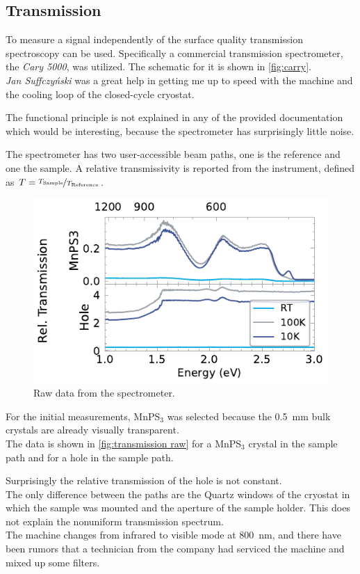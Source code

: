 \documentclass[
	oneside,
	parskip=half,
	a4paper,
]{scrbook}
\begin{document}
\subsection{Transmission}
To measure a signal independently of the surface quality transmission spectroscopy can be used.
Specifically a commercial transmission spectrometer, the \textit{Cary 5000}, was utilized.
The schematic for it is shown in \autoref{fig:carry}.\\
\textit{Jan Suffczyński} was a great help in getting me up to speed with the machine and the cooling loop of the closed-cycle cryostat.

The functional principle is not explained in any of the provided documentation which would be interesting, because the spectrometer has surprisingly little noise.

The spectrometer has two user-accessible beam paths, one is the reference and one the sample.
A relative transmissivity is reported from the instrument, defined as $T = \nicefrac{T_\text{Sample}}{T_\text{Reference}}$.

\begin{figure}[b]
	\centering
	\includegraphics{../figures/2024-03-15 MnPS3 transmission raw.pdf}
	\caption{Raw data from the spectrometer.}
	\label{fig:transmission raw}
\end{figure}
For the initial measurements, MnPS$_3$ was selected because the \SI{.5}{mm} bulk crystals are already visually transparent.\\
The data is shown in \autoref{fig:transmission raw} for a MnPS$_3$ crystal in the sample path and for a hole in the sample path.

Surprisingly the relative transmission of the hole is not constant.\\
The only difference between the paths are the Quartz windows of the cryostat in which the sample was mounted and the aperture of the sample holder.
This does not explain the nonuniform transmission spectrum.\\
The machine changes from infrared to visible mode at \SI{800}{nm}, and there have been rumors that a technician from the company had serviced the machine and mixed up some filters.
\end{document}
